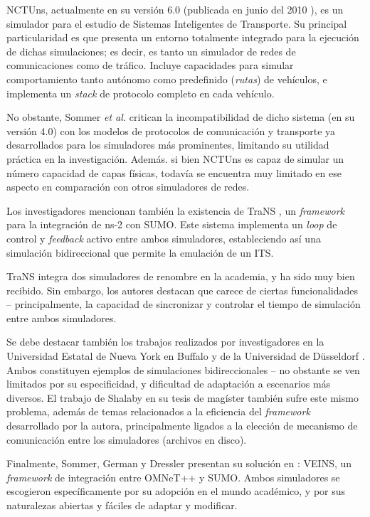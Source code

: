 NCTUns, actualmente en su versión 6.0 (publicada en junio del 2010 \autocite{nctuns6}), es un simulador para el estudio de Sistemas Inteligentes de Transporte. Su principal particularidad es que presenta un entorno totalmente integrado para la ejecución de dichas simulaciones; es decir, es tanto un simulador de redes de comunicaciones como de tráfico. Incluye capacidades para simular comportamiento tanto autónomo como predefinido (\emph{rutas}) de vehículos, e implementa un \emph{stack} de protocolo completo en cada vehículo.

No obstante, Sommer \emph{et al.} critican la incompatibilidad de dicho sistema (en su versión 4.0) con los modelos de protocolos de comunicación y transporte ya desarrollados para los simuladores más prominentes, limitando su utilidad práctica en la investigación. Además. si bien NCTUns es capaz de simular un número capacidad de capas físicas, todavía se encuentra muy limitado en ese aspecto en comparación con otros simuladores de redes.

Los investigadores mencionan también la existencia de TraNS \autocite{piorkowski2008trans}, un \emph{framework} para la integración de ns-2 con SUMO. Este sistema implementa un \emph{loop} de control y \emph{feedback} activo entre ambos simuladores, estableciendo así una simulación bidireccional que permite la emulación de un ITS.

TraNS integra dos simuladores de renombre en la academia, y ha sido muy bien recibido. Sin embargo, los autores destacan que carece de ciertas funcionalidades -- principalmente, la capacidad de sincronizar y controlar el tiempo de simulación entre ambos simuladores.

Se debe destacar también los trabajos realizados por investigadores en la Universidad Estatal de Nueva York en Buffalo \autocite{zhao2016integrated} y de la Universidad de Düsseldorf \autocite{lochert2005multiple}. Ambos constituyen ejemplos de simulaciones bidireccionales -- no obstante se ven limitados por su especificidad, y dificultad de adaptación a escenarios más diversos. El trabajo de Shalaby en su tesis de magíster \autocite{shalaby} también sufre este mismo problema, además de temas relacionados a la eficiencia del \emph{framework} desarrollado por la autora, principalmente ligados a la elección de mecanismo de comunicación entre los simuladores (archivos en disco).


Finalmente, Sommer, German y Dressler presentan su solución en \autocite{sommer_german_dressler}: VEINS, un \textit{framework} de integración entre OMNeT++ y SUMO. Ambos simuladores se escogieron específicamente por su adopción en el mundo académico, y por sus naturalezas abiertas y fáciles de adaptar y modificar.


